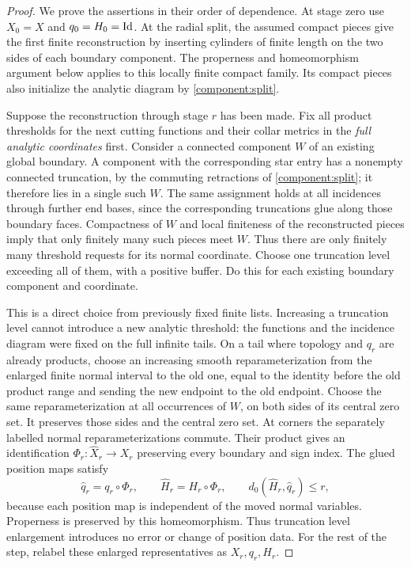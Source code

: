 \begin{proof}
We prove the assertions in their order of dependence.  At stage zero
use $X_0=X$ and $q_0=H_0=\operatorname{Id}$.  At the radial split, the assumed compact
pieces give the first finite reconstruction by inserting cylinders
of finite length on the two sides of each boundary component.  The
properness and homeomorphism argument below applies to this locally
finite compact family.  Its compact pieces also initialize the
analytic diagram by \cref{component:split}.

Suppose the reconstruction through stage $r$ has been made.  Fix all
product thresholds for the next cutting functions and their collar
metrics in the \emph{full analytic coordinates} first.  Consider a
connected component $W$ of an existing global boundary.  A component with
the corresponding star entry has a nonempty connected truncation,
by the commuting retractions of \cref{component:split}; it therefore lies
in a single such $W$.  The same assignment holds at all incidences
through further end bases, since the corresponding truncations glue along
those boundary faces.  Compactness of $W$ and local finiteness of the reconstructed
pieces imply that only finitely many such pieces meet $W$.  Thus there
are only finitely many threshold requests for its normal coordinate.
Choose one truncation level exceeding all of them, with a positive buffer.
Do this for each existing boundary component and coordinate.

This is a direct choice from previously fixed finite lists.  Increasing
a truncation level cannot introduce a new analytic threshold: the functions
and the incidence diagram were fixed on the full infinite tails.
On a tail where topology and $q_r$ are already products, choose an
increasing smooth reparameterization from the enlarged finite normal
interval to the old one, equal to the identity before the old product
range and sending the new endpoint to the old endpoint.  Choose the
same reparameterization at all occurrences of $W$, on both sides of
its central zero set.  It preserves those sides and the central zero set.
At corners the separately labelled normal reparameterizations commute.
Their product gives an identification
$\Phi_r:\widehat X_r\to X_r$ preserving every boundary and sign index.
The glued position maps satisfy
\[
 \widehat q_r=q_r\circ\Phi_r,
 \qquad \widehat H_r=H_r\circ\Phi_r,
 \qquad
 d_0(\widehat H_r,\widehat q_r)\le r,
\]
because each position map is independent of the moved normal
variables.  Properness is preserved by this homeomorphism.  Thus
truncation level enlargement introduces no error or change of position data.
For the rest of the step, relabel these enlarged representatives as
$X_r,q_r,H_r$.


\end{proof}
